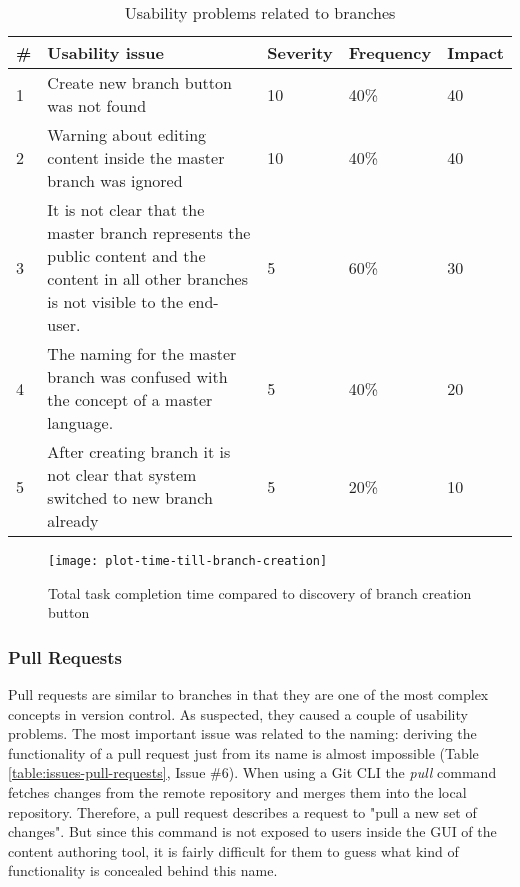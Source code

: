 \begin{table}[h!]
\centering
\begin{tabular}{|l|p{7cm}|l|l|l|}
\hline
\rowcolor[HTML]{EFEFEF}
\textbf{\#} & \textbf{Usability issue} & \textbf{Severity} & \textbf{Frequency} & \textbf{Impact} \\ \hline
1 & Create new branch button was not found & 10 & 40\% & 40 \\ \hline
2 & Warning about editing content inside the master branch was ignored & 10 & 40\% & 40 \\ \hline
3 & It is not clear that the master branch represents the public content and the content in all other branches is not visible to the end-user. & 5 & 60\% & 30 \\ \hline
4 & The naming for the master branch was confused with the concept of a master language. & 5 & 40\% & 20 \\ \hline
5 & After creating branch it is not clear that system switched to new branch already & 5 & 20\% & 10 \\ \hline
\end{tabular}
\caption{Usability problems related to branches}
\label{table:issues-branches}
\end{table}

\begin{figure}[h!]
 \centering
 \texttt{[image: plot-time-till-branch-creation]}
 \caption{Total task completion time compared to discovery of branch creation button}
 \label{fig:branch-creation-time}
\end{figure}

\subsubsection{Pull Requests}
Pull requests are similar to branches in that they are one of the most complex concepts in version control. As suspected, they caused a couple of usability problems. The most important issue was related to the naming: deriving the functionality of a pull request just from its name is almost impossible (Table \ref{table:issues-pull-requests}, Issue \#6). When using a Git CLI the \emph{pull} command fetches changes from the remote repository and merges them into the local repository. Therefore, a pull request describes a request to "pull a new set of changes". But since this command is not exposed to users inside the GUI of the content authoring tool, it is fairly difficult for them to guess what kind of functionality is concealed behind this name.

